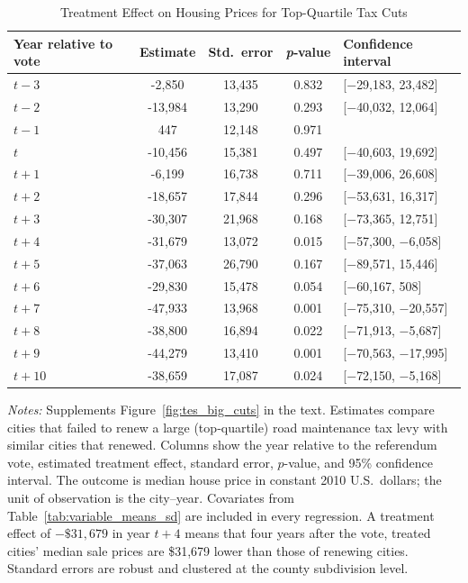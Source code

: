 \begin{table}[htbp]
    \centering
    \caption{Treatment Effect on Housing Prices for Top-Quartile Tax Cuts}
    \label{tab:median_sale_amount_topquartile}
    \begin{threeparttable}
    \begin{minipage}{\linewidth}
    \centering
    \begin{tabular}{p{4.5cm}cccl}
        \hline
        \textbf{Year relative to vote} & \textbf{Estimate} & \textbf{Std.~error} & \textbf{\textit{p}‐value} & \textbf{Confidence interval} \\
        \hline
        $t - 3$  &  -2,850  & 13,435 & 0.832 & [$-$29,183, 23,482] \\
        $t - 2$  & -13,984  & 13,290 & 0.293 & [$-$40,032, 12,064] \\
        $t - 1$  &     447  & 12,148 & 0.971 &  \\
        $t$      & -10,456  & 15,381 & 0.497 & [$-$40,603, 19,692] \\
        $t + 1$  &  -6,199  & 16,738 & 0.711 & [$-$39,006, 26,608] \\
        $t + 2$  & -18,657  & 17,844 & 0.296 & [$-$53,631, 16,317] \\
        $t + 3$  & -30,307  & 21,968 & 0.168 & [$-$73,365, 12,751] \\
        $t + 4$  & -31,679  & 13,072 & 0.015 & [$-$57,300,  $-$6,058] \\
        $t + 5$  & -37,063  & 26,790 & 0.167 & [$-$89,571, 15,446] \\
        $t + 6$  & -29,830  & 15,478 & 0.054 & [$-$60,167,     508] \\
        $t + 7$  & -47,933  & 13,968 & 0.001 & [$-$75,310, $-$20,557] \\
        $t + 8$  & -38,800  & 16,894 & 0.022 & [$-$71,913,  $-$5,687] \\
        $t + 9$  & -44,279  & 13,410 & 0.001 & [$-$70,563, $-$17,995] \\
        $t + 10$ & -38,659  & 17,087 & 0.024 & [$-$72,150,  $-$5,168] \\
        \hline
    \end{tabular}
    \vspace{0.5em}
    \begin{tablenotes}[flushleft]
        \small
        \item \textit{Notes:} Supplements Figure~\ref{fig:tes_big_cuts} in the text. Estimates compare cities that failed to renew a large (top‐quartile) road maintenance tax levy with similar cities that renewed. Columns show the year relative to the referendum vote, estimated treatment effect, standard error, \(p\)-value, and 95\% confidence interval. The outcome is median house price in constant 2010 U.S.\ dollars; the unit of observation is the city–year. Covariates from Table~\ref{tab:variable_means_sd} are included in every regression. A treatment effect of \(-\$31{,}679\) in year \(t+4\) means that four years after the vote, treated cities’ median sale prices are \$31,679 lower than those of renewing cities. Standard errors are robust and clustered at the county subdivision level.

\end{tablenotes}
\end{minipage}
\end{threeparttable}
\end{table}

